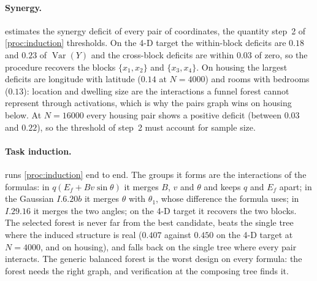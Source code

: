 \documentclass[11pt]{article}
\theoremstyle{definition}
\theoremstyle{remark}
\newcommand{\Var}{\operatorname{Var}}
\begin{document}
\paragraph{Synergy.}
 estimates the synergy deficit of every pair of coordinates, the
quantity step~2 of \cref{proc:induction} thresholds.  On the 4-D target the within-block
deficits are $0.18$ and $0.23$ of $\Var(Y)$ and the cross-block deficits are within
$0.03$ of zero, so the procedure recovers the blocks $\{x_1,x_2\}$ and $\{x_3,x_4\}$.  On
housing the largest deficits are longitude with latitude ($0.14$ at $N=4000$) and rooms
with bedrooms ($0.13$): location and dwelling size are the interactions a funnel forest
cannot represent through activations, which is why the pairs graph wins on housing below.
At $N=16000$ every housing pair shows a positive deficit (between $0.03$ and $0.22$),
so the threshold of step~2 must account for sample size.

\begin{table}[t]
\centering\small
\resizebox{\linewidth}{!}{}
\caption{Task induction end to end (\cref{proc:induction}): the groups that step~2 forms at
threshold $\tau=0.05$ (most frequent over seeds), and test RMSE$/\mathrm{sd}$ of the single
tree, of the generic balanced forest over the inputs, and of the forest selected on
validation data among the single tree, the balanced forest and the induced forests for
$\tau\in\{0.02,0.05,0.1,0.2\}$ with activation or hybrid messages.}
\label{tab:induce}
\end{table}

\paragraph{Task induction.}
 runs \cref{proc:induction} end to end.  The groups it forms are the
interactions of the formulas: in $q(E_f+Bv\sin\theta)$ it merges $B$, $v$ and $\theta$ and
keeps $q$ and $E_f$ apart; in the Gaussian $I.6.20b$ it merges $\theta$ with $\theta_1$,
whose difference the formula uses; in $I.29.16$ it merges the two angles; on the 4-D
target it recovers the two blocks.  The selected forest is never far from the best
candidate, beats the single tree where the induced structure is real ($0.407$ against
$0.450$ on the 4-D target at $N=4000$, and on housing), and falls back on the single tree
where every pair interacts.  The generic balanced forest is the worst design on every
formula: the forest needs the right graph, and verification at the composing tree finds
it.
\end{document}
